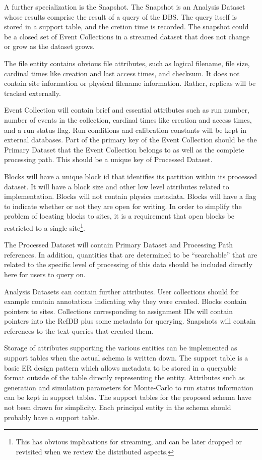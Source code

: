 \documentclass[pdftex]{cmspaper}
\begin{document}
{A further specialization is the Snapshot.  The Snapshot is an Analysis
Dataset whose results comprise the result of a query of the DBS.
The query itself is stored in a support table, and the cretion time
is recorded.  The snapshot could be a closed set of Event Collections
in a streamed dataset that does not change or grow as the dataset grows.

The file entity contains obvious file attributes, such as logical
filename, file size, cardinal times like creation and last access times,
and checksum.  It does not contain site information or physical filename
information.  Rather, replicas will be tracked externally.

Event Collection will contain brief and essential attributes such as
run number, number of events in the collection, cardinal times like
creation and access times, and a run status flag.  Run conditions and
calibration constants will be kept in external databases.  Part of the
primary key of the Event Collection should be the Primary Dataset that
the Event Collection belongs to as well as the complete processing path.
This should be a unique key of Processed Dataset.

Blocks will have a unique block id that identifies its partition within
its processed dataset.  It will have a block size and other low level
attributes related to implementation.  Blocks will not contain physics
metadata.  Blocks will have a flag to indicate whether or not they are
open for writing.  In order to simplify the problem of locating blocks
to sites, it is a requirement that open blocks be restricted to a single
site\footnote{This has obvious implications for streaming, and can be
later dropped or revisited when we review the distributed aspects.}.

The Processed Dataset will contain Primary Dataset and Processing
Path references.  In addition, quantities that are determined to be
``searchable'' that are related to the specific level of processing of
this data should be included directly here for users to query on.

Analysis Datasets can contain further attributes.  User collections
should for example contain annotations indicating why they were created.
Blocks contain pointers to sites.  Collections corresponding to
assignment IDs will contain pointers into the RefDB plus some metadata
for querying. Snapshots will contain references to the text queries that
created them.

Storage of attributes supporting the various entities  can be implemented
as support tables when the actual schema is written down.  The support
table is a basic ER design pattern which allows metadata to be stored in
a queryable format outside of the table directly representing the entity.
Attributes such as generation and simulation parameters for Monte-Carlo
to run status information can be kept in support tables.   The support
tables for the proposed schema have not been drawn for simplicity.
Each principal entity in the schema should probably have a support table.

}
\end{document}
